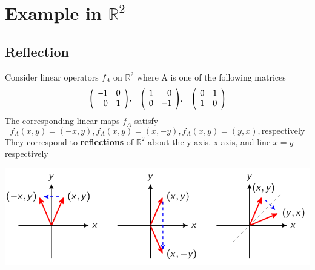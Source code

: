 \documentclass{article}[18pt]
\begin{document}
\section{Example in $\mathbb{R}^2$}
\subsection{Reflection}
Consider linear operators $f_A$ on $\mathbb{R}^2$ where A is one of the following matrices
$$\left( \begin{array} { r r } { - 1 } & { 0 } \\ { 0 } & { 1 } \end{array} \right) , \quad \left( \begin{array} { r r } { 1 } & { 0 } \\ { 0 } & { - 1 } \end{array} \right) , \quad \left( \begin{array} { l l } { 0 } & { 1 } \\ { 1 } & { 0 } \end{array} \right)$$
The corresponding linear maps $f_A$ satisfy
$$f _ { A } ( x , y ) = ( - x , y ) , f _ { A } ( x , y ) = ( x , - y ) , f _ { A } ( x , y ) = ( y , x ) ,\text{respectively}$$
They correspond to \textbf{reflections} of $\mathbb{R}^2$ about the y-axis. x-axis, and line $x=y$ respectively
\begin{center}
	\includegraphics[scale=0.7]{reflections}
\end{center}
\end{document}
